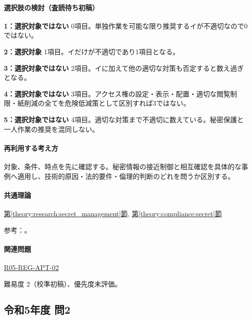 \paragraph{選択肢の検討（査読待ち初稿）}\mbox{}\par

\noindent\textbf{1：選択対象ではない} 0項目。単独作業を可能な限り推奨するイが不適切なので0ではない。\par

\noindent\textbf{2：選択対象} 1項目。イだけが不適切であり1項目となる。\par

\noindent\textbf{3：選択対象ではない} 2項目。イに加えて他の適切な対策も否定すると数え過ぎとなる。\par

\noindent\textbf{4：選択対象ではない} 3項目。アクセス権の設定・表示・配置・適切な閲覧制限・紙削減の全てを危険低減策として区別すれば3ではない。\par

\noindent\textbf{5：選択対象ではない} 4項目。適切な対策まで不適切に数えている。秘密保護と一人作業の推奨を混同しない。\par

\paragraph{再利用する考え方} 対象、条件、時点を先に確認する。秘密情報の接近制御と相互確認を具体的な事例へ適用し、技術的原因・法的要件・倫理的判断のどれを問うか区別する。

\paragraph{共通理論} \hyperref[theory:research:secret_management]{第\ref*{theory:research:secret_management}節}, \hyperref[theory:compliance:secret]{第\ref*{theory:compliance:secret}節}

\par 参考：\cite{meti_secret_handbook2024}。

\paragraph{関連問題} \hyperref[q:r05-reg-apt-02]{R05-REG-APT-02}

\par 難易度 2（校準初稿）、優先度未評価。

\subsection{令和5年度 問2}
\label{q:r05-reg-apt-02}

